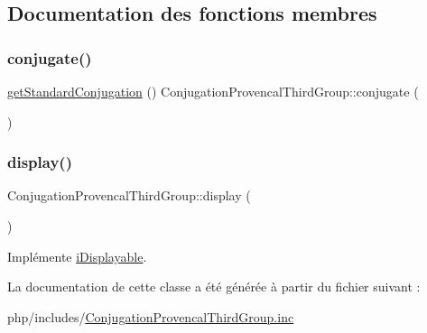 \subsection{Documentation des fonctions membres}
\hypertarget{class_conjugation_provencal_third_group_ab4005ad44671e23386f8ef1f833b6959}{}\label{class_conjugation_provencal_third_group_ab4005ad44671e23386f8ef1f833b6959} 
\subsubsection{\texorpdfstring{conjugate()}{conjugate()}}
{\footnotesize\ttfamily \hyperlink{class_conjugation_base_a97684bf47a4b158a2d4f5716f9187730}{get\+Standard\+Conjugation} () Conjugation\+Provencal\+Third\+Group\+::conjugate (\begin{DoxyParamCaption}{ }\end{DoxyParamCaption})\hspace{0.3cm}{\ttfamily [protected]}}

\hypertarget{class_conjugation_provencal_third_group_a5be367146782812cba9ff8209cf79be2}{}\label{class_conjugation_provencal_third_group_a5be367146782812cba9ff8209cf79be2} 
\subsubsection{\texorpdfstring{display()}{display()}}
{\footnotesize\ttfamily Conjugation\+Provencal\+Third\+Group\+::display (\begin{DoxyParamCaption}{ }\end{DoxyParamCaption})}



Implémente \hyperlink{interfacei_displayable_a0264fd455c876e897f754cf85f1681ca}{i\+Displayable}.



La documentation de cette classe a été générée à partir du fichier suivant \+:\begin{DoxyCompactItemize}
\item 
php/includes/\hyperlink{_conjugation_provencal_third_group_8inc}{Conjugation\+Provencal\+Third\+Group.\+inc}\end{DoxyCompactItemize}
